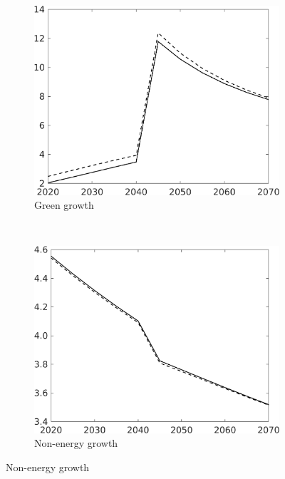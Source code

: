 \begin{figure}[h!!]
	 \begin{minipage}[]{0.04\textwidth}
		\
	\end{minipage}
\begin{subfigure}[]{0.4\textwidth}
	\caption{Green growth}
	\includegraphics[width=1\textwidth]{../../codding_model/own_basedOnFried/optimalPol_010922_revision/figures/all_13Sept22/CompTauf_bytaul_Reg5_gAg_spillover0_nsk0_xgr0_knspil0_sep0_LFlimit1_emsbase0_countec0_GovRev0_etaa0.79_lgd0.png}
\end{subfigure}	 
\begin{minipage}[]{0.1\textwidth}
\
\end{minipage}
\begin{subfigure}[]{0.4\textwidth}
\caption{ Non-energy growth}
\includegraphics[width=1\textwidth]{../../codding_model/own_basedOnFried/optimalPol_010922_revision/figures/all_13Sept22/CompTauf_bytaul_Reg5_gAn_spillover0_nsk0_xgr0_knspil0_sep0_LFlimit1_emsbase0_countec0_GovRev0_etaa0.79_lgd0.png}

\end{subfigure}
\end{figure}
